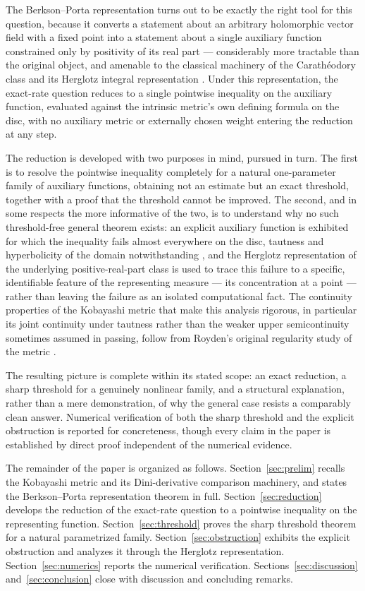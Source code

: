 \documentclass[pdflatex,sn-mathphys-num]{sn-jnl}%
\theoremstyle{thmstyleone}%
\theoremstyle{thmstyletwo}%
\theoremstyle{thmstylethree}%
\begin{document}
The Berkson--Porta representation turns out to be exactly the right tool for this question, because it converts a statement about an arbitrary holomorphic vector field with a fixed point into a statement about a single auxiliary function constrained only by positivity of its real part --- considerably more tractable than the original object, and amenable to the classical machinery of the Carath\'eodory class and its Herglotz integral representation \cite{ahlfors1979complex}. Under this representation, the exact-rate question reduces to a single pointwise inequality on the auxiliary function, evaluated against the intrinsic metric's own defining formula on the disc, with no auxiliary metric or externally chosen weight entering the reduction at any step.

The reduction is developed with two purposes in mind, pursued in turn. The first is to resolve the pointwise inequality completely for a natural one-parameter family of auxiliary functions, obtaining not an estimate but an exact threshold, together with a proof that the threshold cannot be improved. The second, and in some respects the more informative of the two, is to understand why no such threshold-free general theorem exists: an explicit auxiliary function is exhibited for which the inequality fails almost everywhere on the disc, tautness and hyperbolicity of the domain notwithstanding \cite{abate1989iteration}, and the Herglotz representation of the underlying positive-real-part class is used to trace this failure to a specific, identifiable feature of the representing measure --- its concentration at a point --- rather than leaving the failure as an isolated computational fact. The continuity properties of the Kobayashi metric that make this analysis rigorous, in particular its joint continuity under tautness rather than the weaker upper semicontinuity sometimes assumed in passing, follow from Royden's original regularity study of the metric \cite{royden1971remarks}.

The resulting picture is complete within its stated scope: an exact reduction, a sharp threshold for a genuinely nonlinear family, and a structural explanation, rather than a mere demonstration, of why the general case resists a comparably clean answer. Numerical verification of both the sharp threshold and the explicit obstruction is reported for concreteness, though every claim in the paper is established by direct proof independent of the numerical evidence.

The remainder of the paper is organized as follows. Section~\ref{sec:prelim} recalls the Kobayashi metric and its Dini-derivative comparison machinery, and states the Berkson--Porta representation theorem in full. Section~\ref{sec:reduction} develops the reduction of the exact-rate question to a pointwise inequality on the representing function. Section~\ref{sec:threshold} proves the sharp threshold theorem for a natural parametrized family. Section~\ref{sec:obstruction} exhibits the explicit obstruction and analyzes it through the Herglotz representation. Section~\ref{sec:numerics} reports the numerical verification. Sections~\ref{sec:discussion} and~\ref{sec:conclusion} close with discussion and concluding remarks.
\end{document}
